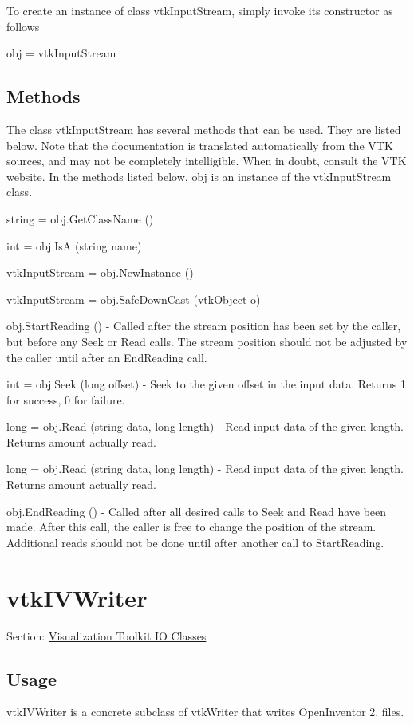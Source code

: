 To create an instance of class vtk\-Input\-Stream, simply invoke its constructor as follows \begin{DoxyVerb}  obj = vtkInputStream
\end{DoxyVerb}
 \hypertarget{vtkwidgets_vtkxyplotwidget_Methods}{}\subsection{Methods}\label{vtkwidgets_vtkxyplotwidget_Methods}
The class vtk\-Input\-Stream has several methods that can be used. They are listed below. Note that the documentation is translated automatically from the V\-T\-K sources, and may not be completely intelligible. When in doubt, consult the V\-T\-K website. In the methods listed below, {\ttfamily obj} is an instance of the vtk\-Input\-Stream class. 
\begin{DoxyItemize}
\item {\ttfamily string = obj.\-Get\-Class\-Name ()}  
\item {\ttfamily int = obj.\-Is\-A (string name)}  
\item {\ttfamily vtk\-Input\-Stream = obj.\-New\-Instance ()}  
\item {\ttfamily vtk\-Input\-Stream = obj.\-Safe\-Down\-Cast (vtk\-Object o)}  
\item {\ttfamily obj.\-Start\-Reading ()} -\/ Called after the stream position has been set by the caller, but before any Seek or Read calls. The stream position should not be adjusted by the caller until after an End\-Reading call.  
\item {\ttfamily int = obj.\-Seek (long offset)} -\/ Seek to the given offset in the input data. Returns 1 for success, 0 for failure.  
\item {\ttfamily long = obj.\-Read (string data, long length)} -\/ Read input data of the given length. Returns amount actually read.  
\item {\ttfamily long = obj.\-Read (string data, long length)} -\/ Read input data of the given length. Returns amount actually read.  
\item {\ttfamily obj.\-End\-Reading ()} -\/ Called after all desired calls to Seek and Read have been made. After this call, the caller is free to change the position of the stream. Additional reads should not be done until after another call to Start\-Reading.  
\end{DoxyItemize}\hypertarget{vtkio_vtkivwriter}{}\section{vtk\-I\-V\-Writer}\label{vtkio_vtkivwriter}
Section\-: \hyperlink{sec_vtkio}{Visualization Toolkit I\-O Classes} \hypertarget{vtkwidgets_vtkxyplotwidget_Usage}{}\subsection{Usage}\label{vtkwidgets_vtkxyplotwidget_Usage}
vtk\-I\-V\-Writer is a concrete subclass of vtk\-Writer that writes Open\-Inventor 2. files.

